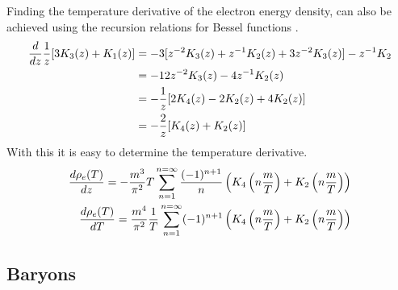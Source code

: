 Finding the temperature derivative of the electron energy density, can also be achieved using the recursion relations for Bessel functions \cite[\href{https://dlmf.nist.gov/10.29.E2}{(10.29.2)}]{NIST:DLMF}.
\begin{align}
    \frac{d}{dz} \frac{1}{z}[3K_{3}(z)+K_{1}(z)]&=-3[z^{-2} K_{3}(z)+z^{-1} K_{2}(z)+ 3z^{-2} K_{3}(z)]-z^{-1} K_{2}\\
    &=-12 z^{-2} K_{3}(z)-4z^{-1} K_{2}(z)\\
    &=-\frac{1}{z}[2K_{4}(z)-2K_{2}(z)+4 K_{2}(z)]\\
    &=-\frac{2}{z}[K_{4}(z)+K_{2}(z)]
\end{align}
With this it is easy to determine the temperature derivative.
\begin{align}
    \frac{d\rho_e(T)}{dz}=-\frac{m^3}{\pi^2} T \sum_{n=1}^{n=\infty} \frac{(-1)^{n+1}}{n}  \left(K_4\left(n\frac{m }{T}\right) + K_2\left(n\frac{m }{T}\right) \right)\\
    \frac{d\rho_e(T)}{dT}=\frac{m^4}{\pi^2} \frac{1}{T} \sum_{n=1}^{n=\infty} (-1)^{n+1}   \left(K_4\left(n\frac{m }{T}\right) + K_2\left(n\frac{m }{T}\right) \right)
\end{align}


\subsection{Baryons}





